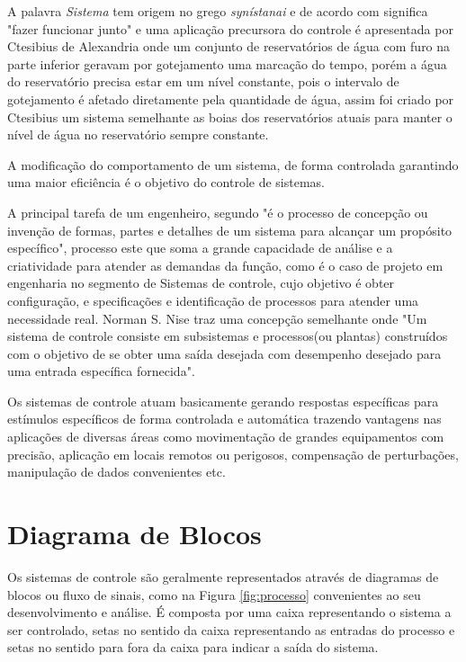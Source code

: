 
A palavra \emph{Sistema} tem origem no grego \emph{synístanai} e de 
acordo com \cite{gramaticaNET} significa "fazer funcionar junto" e uma 
aplicação precursora do controle é apresentada por Ctesibius de Alexandria 
 \cite{encyclopediaBritannica}  
onde um conjunto de reservatórios de água com furo na parte inferior 
geravam por gotejamento uma marcação do tempo, 
porém a água do reservatório precisa estar em um nível constante, 
pois o intervalo de gotejamento é afetado diretamente pela quantidade de água, 
assim foi criado por Ctesibius um sistema semelhante 
as boias dos reservatórios atuais para manter o nível de água no 
reservatório sempre constante.

A modificação do comportamento de um sistema, 
de forma controlada garantindo uma maior eficiência é o 
objetivo do controle de sistemas. 

A principal tarefa de um engenheiro, 
segundo \cite{dorf2011modern} 
"é o processo de concepção ou invenção de formas, 
partes e detalhes de um sistema para alcançar um propósito específico", 
processo este que soma a grande capacidade de análise e a 
criatividade para atender as demandas da função, 
como é o caso de projeto em engenharia no segmento de Sistemas de controle, 
cujo objetivo é obter configuração, e
specificações e identificação de processos para atender uma necessidade real. 
Norman S. Nise traz uma concepção semelhante onde 
"Um sistema de controle consiste em subsistemas e processos(ou plantas) 
construídos com o objetivo de se obter uma saída desejada com 
desempenho desejado para uma entrada específica fornecida".

Os sistemas de controle atuam basicamente gerando respostas específicas 
para estímulos específicos de forma controlada e automática trazendo 
vantagens nas aplicações de diversas áreas como movimentação de 
grandes equipamentos com precisão, 
aplicação em locais remotos ou perigosos, 
compensação de perturbações, manipulação de dados convenientes etc.



\section{Diagrama de Blocos}

Os sistemas de controle são geralmente representados através de 
diagramas de blocos ou fluxo de sinais, 
como na Figura \ref{fig:processo} convenientes ao seu 
desenvolvimento e análise. 
É composta por uma caixa representando o sistema a ser controlado, 
setas no sentido da caixa representando as entradas do processo e 
setas no sentido para fora da caixa para indicar a saída do sistema.

